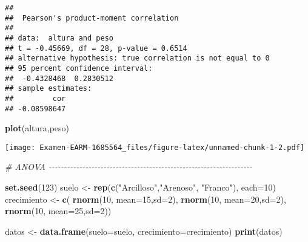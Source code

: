 \documentclass[
]{article}
\newenvironment{Shaded}{\begin{snugshade}}{\end{snugshade}}
\newcommand{\AttributeTok}[1]{\textcolor[rgb]{0.13,0.29,0.53}{#1}}
\newcommand{\CommentTok}[1]{\textcolor[rgb]{0.56,0.35,0.01}{\textit{#1}}}
\newcommand{\DecValTok}[1]{\textcolor[rgb]{0.00,0.00,0.81}{#1}}
\newcommand{\FunctionTok}[1]{\textcolor[rgb]{0.13,0.29,0.53}{\textbf{#1}}}
\newcommand{\NormalTok}[1]{#1}
\newcommand{\OtherTok}[1]{\textcolor[rgb]{0.56,0.35,0.01}{#1}}
\newcommand{\StringTok}[1]{\textcolor[rgb]{0.31,0.60,0.02}{#1}}
\begin{document}
\begin{verbatim}
## 
##  Pearson's product-moment correlation
## 
## data:  altura and peso
## t = -0.45669, df = 28, p-value = 0.6514
## alternative hypothesis: true correlation is not equal to 0
## 95 percent confidence interval:
##  -0.4328468  0.2830512
## sample estimates:
##         cor 
## -0.08598647
\end{verbatim}

\begin{Shaded}
\begin{Highlighting}[]
\FunctionTok{plot}\NormalTok{(altura,peso)}
\end{Highlighting}
\end{Shaded}

\texttt{[image: Examen-EARM-1685564\_files/figure-latex/unnamed-chunk-1-2.pdf]}

\begin{Shaded}
\begin{Highlighting}[]
\CommentTok{\# ANOVA {-}{-}{-}{-}{-}{-}{-}{-}{-}{-}{-}{-}{-}{-}{-}{-}{-}{-}{-}{-}{-}{-}{-}{-}{-}{-}{-}{-}{-}{-}{-}{-}{-}{-}{-}{-}{-}{-}{-}{-}{-}{-}{-}{-}{-}{-}{-}{-}{-}{-}{-}{-}{-}{-}{-}{-}{-}{-}{-}{-}{-}{-}{-}{-}{-}{-}{-}}

\FunctionTok{set.seed}\NormalTok{(}\DecValTok{123}\NormalTok{)}
\NormalTok{suelo }\OtherTok{\textless{}{-}} \FunctionTok{rep}\NormalTok{(}\FunctionTok{c}\NormalTok{(}\StringTok{"Arcilloso"}\NormalTok{,}\StringTok{"Arenoso"}\NormalTok{, }\StringTok{"Franco"}\NormalTok{), }\AttributeTok{each=}\DecValTok{10}\NormalTok{)}
\NormalTok{crecimiento }\OtherTok{\textless{}{-}} \FunctionTok{c}\NormalTok{(}
  \FunctionTok{rnorm}\NormalTok{(}\DecValTok{10}\NormalTok{, }\AttributeTok{mean=}\DecValTok{15}\NormalTok{,}\AttributeTok{sd=}\DecValTok{2}\NormalTok{),}
  \FunctionTok{rnorm}\NormalTok{(}\DecValTok{10}\NormalTok{, }\AttributeTok{mean=}\DecValTok{20}\NormalTok{,}\AttributeTok{sd=}\DecValTok{2}\NormalTok{),}
  \FunctionTok{rnorm}\NormalTok{(}\DecValTok{10}\NormalTok{, }\AttributeTok{mean=}\DecValTok{25}\NormalTok{,}\AttributeTok{sd=}\DecValTok{2}\NormalTok{))}

\NormalTok{datos }\OtherTok{\textless{}{-}} \FunctionTok{data.frame}\NormalTok{(}\AttributeTok{suelo=}\NormalTok{suelo, }\AttributeTok{crecimiento=}\NormalTok{crecimiento)}
\FunctionTok{print}\NormalTok{(datos)}
\end{Highlighting}
\end{Shaded}
\end{document}
